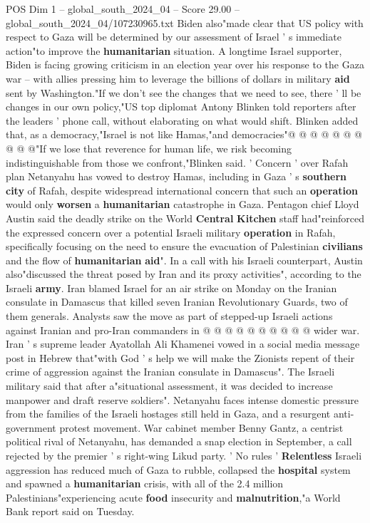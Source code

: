\begin{textsample}{POS Dim 1 – global\_south\_2024\_04 – Score 29.00 – global\_south\_2024\_04/107230965.txt}
Biden also"made clear that US policy with respect to Gaza will be determined by our assessment of Israel ' s immediate action"to improve the \textbf{humanitarian} situation.
A longtime Israel supporter, Biden is facing growing criticism in an election year over his response to the Gaza war -- with allies pressing him to leverage the billions of dollars in military \textbf{aid} sent by Washington."If we don't see the changes that we need to see, there ' ll be changes in our own policy,"US top diplomat Antony Blinken told reporters after the leaders ' phone call, without elaborating on what would shift.
Blinken added that, as a democracy,"Israel is not like Hamas,"and democracies"@ @ @ @ @ @ @ @ @ @"If we lose that reverence for human life, we risk becoming indistinguishable from those we confront,"Blinken said. ' Concern ' over Rafah plan Netanyahu has vowed to destroy Hamas, including in Gaza ' s \textbf{southern} \textbf{city} of Rafah, despite widespread international concern that such an \textbf{operation} would only \textbf{worsen} a \textbf{humanitarian} catastrophe in Gaza.
Pentagon chief Lloyd Austin said the deadly strike on the World \textbf{Central} \textbf{Kitchen} staff had"reinforced the expressed concern over a potential Israeli military \textbf{operation} in Rafah, specifically focusing on the need to ensure the evacuation of Palestinian \textbf{civilians} and the flow of \textbf{humanitarian} \textbf{aid}".
In a call with his Israeli counterpart, Austin also"discussed the threat posed by Iran and its proxy activities", according to the Israeli \textbf{army}.
Iran blamed Israel for an air strike on Monday on the Iranian consulate in Damascus that killed seven Iranian Revolutionary Guards, two of them generals.
Analysts saw the move as part of stepped-up Israeli actions against Iranian and pro-Iran commanders in @ @ @ @ @ @ @ @ @ @ wider war.
Iran ' s supreme leader Ayatollah Ali Khamenei vowed in a social media message post in Hebrew that"with God ' s help we will make the Zionists repent of their crime of aggression against the Iranian consulate in Damascus".
The Israeli military said that after a"situational assessment, it was decided to increase manpower and draft reserve soldiers".
Netanyahu faces intense domestic pressure from the families of the Israeli hostages still held in Gaza, and a resurgent anti-government protest movement.
War cabinet member Benny Gantz, a centrist political rival of Netanyahu, has demanded a snap election in September, a call rejected by the premier ' s right-wing Likud party. ' No rules ' \textbf{Relentless} Israeli aggression has reduced much of Gaza to rubble, collapsed the \textbf{hospital} system and spawned a \textbf{humanitarian} crisis, with all of the 2.4 million Palestinians"experiencing acute \textbf{food} insecurity and \textbf{malnutrition},"a World Bank report said on Tuesday.

\end{textsample}

